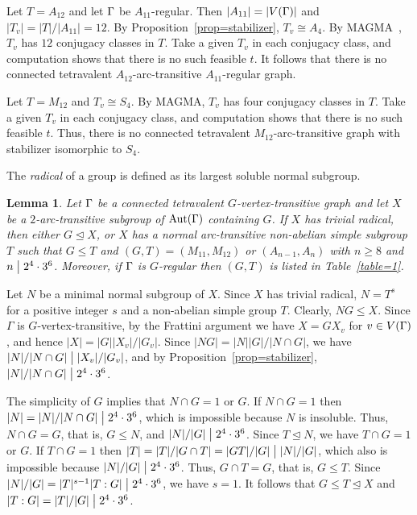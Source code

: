 \documentclass[12pt]{article}
\newtheorem{lem}{Lemma}[section]%
\def\di{\bigm|} \def\lg{\langle} \def\rg{\rangle}
\def\f{\noindent}
\def\Aut{\hbox{\rm Aut}}
\newcommand{\qed}{\mbox{\raisebox{0.7ex}{\fbox{}}} \vspace{4truemm}}
\begin{document}
Let $T=A_{12}$ and let $\Gamma$ be $A_{11}$-regular. Then $|A_{11}|=|V(\Gamma)|$ and $|T_v|=|T|/|A_{11}|=12$. By Proposition~\ref{prop=stabilizer}, $T_v\cong A_4$. By MAGMA~\cite{magma}, $T_v$ has $12$ conjugacy classes in $T$. Take a given $T_v$ in each conjugacy class, and computation shows that there is no such feasible $t$. It follows that there is no connected tetravalent $A_{12}$-arc-transitive $A_{11}$-regular graph.

Let $T=M_{12}$ and $T_v\cong S_4$. By MAGMA, $T_v$ has four conjugacy classes in $T$. Take a given $T_v$ in each conjugacy class, and computation shows that there is no such feasible $t$. Thus, there is no connected tetravalent $M_{12}$-arc-transitive graph with stabilizer isomorphic to $S_4$.
\hfill\qed

The {\em radical} of a group is defined as its largest soluble normal subgroup.

\begin{lem}\label{lem=insolvable}
Let $\Gamma$ be a connected tetravalent $G$-vertex-transitive graph and let $X$ be a $2$-arc-transitive subgroup of $\Aut(\G)$ containing $G$.
If $X$ has trivial radical, then either $G\unlhd X$, or $X$ has a normal arc-transitive non-abelian simple  subgroup $T$ such that $G\leq T$ and $(G,T)=(M_{11},M_{12})$ or $(A_{n-1},A_n)$ with $n\geq 8$ and $n\di 2^4 \cdot 3^6$.
Moreover, if $\Gamma$ is $G$-regular then $(G,T)$ is listed in Table~\ref{table=1}.
\end{lem}

\f {\bf Proof:} Let $N$ be a minimal normal subgroup of $X$. Since $X$ has trivial radical, $N=T^s$ for a positive integer $s$ and a non-abelian simple group $T$. Clearly, $NG\leq X$. Since $\Gamma$ is $G$-vertex-transitive,  by the Frattini argument we have $X=GX_v$ for $v\in V(\Gamma)$, and hence $|X|=|G||X_v|/|G_v|$. Since $|NG|=|N||G|/|N \cap G|$, we have $|N|/|N\cap G|\di |X_v|/|G_v|$, and by Proposition~\ref{prop=stabilizer}, $|N|/|N\cap G|\di 2^4\cdot 3^6$.

The simplicity of $G$ implies that $N \cap G =1$ or $G$. If $N \cap G =1$ then $|N|=|N|/|N\cap G|\di 2^4\cdot 3^6$, which is impossible because  $N$ is insoluble. Thus, $N \cap G =G$, that is, $G\leq N$, and $|N|/|G|\di 2^4\cdot 3^6$. Since $T\unlhd N$, we have $T\cap G=1$ or $G$. If $T\cap G=1$ then
$|T|=|T|/|G\cap T|=|GT|/|G|\di |N|/|G|$, which also is impossible because $|N|/|G|\di 2^4\cdot 3^6$. Thus, $G\cap T=G$, that is, $G\leq T$. Since $|N|/|G|=|T|^{s-1}|T:G|\di 2^4\cdot 3^6$, we have $s=1$. It follows that $G\leq T\unlhd X$ and $|T:G|=|T|/|G|\di 2^4\cdot 3^6$.
\end{document}
